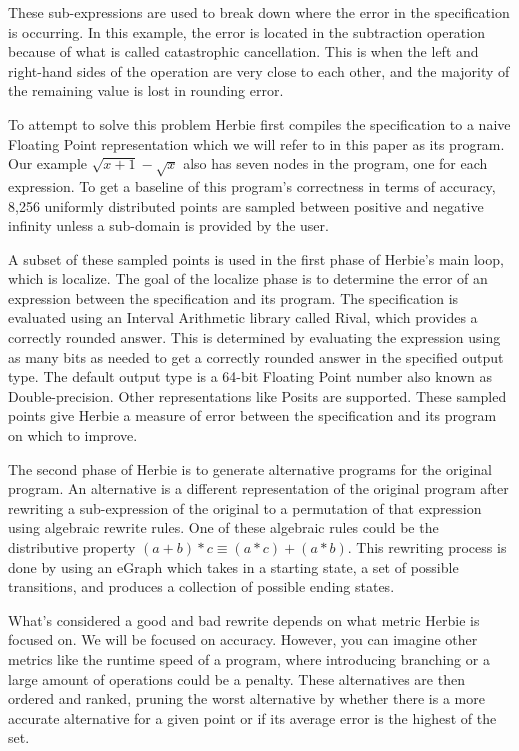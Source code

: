 \documentclass{article}
\begin{document}
These sub-expressions are used to break down where the error in the specification is occurring. In this example, the error is located in the subtraction operation because of what is called catastrophic cancellation. This is when the left and right-hand sides of the operation are very close to each other, and the majority of the remaining value is lost in rounding error. 

To attempt to solve this problem Herbie first compiles the specification to a naive Floating Point representation which we will refer to in this paper as its program. Our example $\sqrt{x + 1} - \sqrt{x}$ also has seven nodes in the program, one for each expression. To get a baseline of this program's correctness in terms of accuracy, 8,256 uniformly distributed points are sampled between positive and negative infinity unless a sub-domain is provided by the user. 

A subset of these sampled points is used in the first phase of Herbie's main loop, which is localize. The goal of the localize phase is to determine the error of an expression between the specification and its program. The specification is evaluated using an Interval Arithmetic library called Rival\cite{Rival}, which provides a correctly rounded answer. This is determined by evaluating the expression using as many bits as needed to get a correctly rounded answer in the specified output type. The default output type is a 64-bit Floating Point number also known as Double-precision. Other representations like Posits \cite{Posit} are supported. These sampled points give Herbie a measure of error between the specification and its program on which to improve. 

The second phase of Herbie is to generate alternative programs for the original program. An alternative is a different representation of the original program after rewriting a sub-expression of the original to a permutation of that expression using algebraic rewrite rules. One of these algebraic rules could be the distributive property $(a +b) * c \equiv (a * c) + ( a * b)$. This rewriting process is done by using an eGraph which takes in a starting state, a set of possible transitions, and produces a collection of possible ending states.

What's considered a good and bad rewrite depends on what metric Herbie is focused on. We will be focused on accuracy. However, you can imagine other metrics like the runtime speed of a program, where introducing branching or a large amount of operations could be a penalty. These alternatives are then ordered and ranked, pruning the worst alternative by whether there is a more accurate alternative for a given point or if its average error is the highest of the set.
\end{document}
